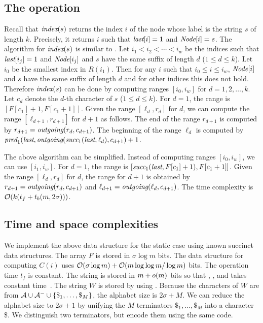 \subsection{The {\search} operation}
Recall that ${\textit{index}}(s)$ returns the index $i$ of the node whose label 
is the string $s$ of length $k$.
Precisely, it returns $i$ such that ${\textit{last}}[i] = 1$ and ${\textit{Node}}[i] = s$.
The algorithm for ${\textit{index}}(s)$ is similar to \cite{FM05}.
Let $i_1 < i_2 < \cdots < i_w$ be the indices such that
${\textit{last}}[i_j] = 1$ and ${\textit{Node}}[i_j]$ and $s$ have the same suffix of length $d$ ($1 \le d \le k$).
Let $i_0$ be the smallest index in $R(i_1)$.
Then for any $i$ such that $i_0 \le i \le i_w$, ${\textit{Node}}[i]$ and $s$ have the same suffix of length $d$
and for other indices this does not hold.
Therefore ${\textit{index}}(s)$ can be done by computing 
ranges $[i_0, i_w]$ for $d = 1,2,\ldots,k$.
Let $c_d$ denote the $d$-th character of $s$ ($1 \le d \le k$).
For $d=1$, the range is $[F[c_1]+1, F[c_1+1]]$.
Given the range $[\ell_d, r_d]$ for $d$,  we can compute the range $[\ell_{d+1}, r_{d+1}]$ for $d+1$
as follows.  The end of the range $r_{d+1}$ is computed by $r_{d+1} = {\textit{outgoing}}(r_d, c_{d+1})$.
The beginning of the range $\ell_d$ is computed by ${\textit{pred}}_1({\textit{last}},{\textit{outgoing}}({\textit{succ}}_1({\textit{last}}, \ell_d), c_{d+1})+1$.

The above algorithm can be simplified.  Instead of computing ranges $[i_0, i_w]$,
we can use $[i_1, i_w]$.  For $d=1$, the range is $[{\textit{succ}}_1({\textit{last}},F[c_1]+1), F[c_1+1]]$.
Given the range $[\ell_d, r_d]$ for $d$, the range for $d+1$ is obtained by
$r_{d+1} = {\textit{outgoing}}(r_d, c_{d+1})$ and $\ell_{d+1} = {\textit{outgoing}}(\ell_d, c_{d+1})$.
The time complexity is $\mathcal{O}(k(t_f + t_b(m,2\sigma)))$.

\subsection{Time and space complexities}
We implement the above data structure for the static case using known succinct data structures.
The array $F$ is stored in $\sigma \log m$ bits.  The data structure for computing $C(i)$
uses $\mathcal{O}(\sigma \log m) + \mathcal{O}(m \log \log m/\log m)$ bits.  The operation time $t_f$ is constant.
The string {\last} is stored in $m+o(m)$ bits so that {\rank}, {\select}, and {\access} takes constant 
time~\cite{RRR07}.  The string $W$ is stored by using \cite{FerManMakNav06}.  
Because the characters
of $W$ are from ${\cal A} \cup {\cal A}^- \cup \{\$_1,\ldots,\$_M\}$, 
the alphabet size is $2\sigma + M$.
%
We can reduce the alphabet size to $2\sigma+1$ by unifying the $M$ terminators
$\$_1,\ldots,\$_M$ into a character \$.  We distinguish two terminators, but
encode them using the same code.

